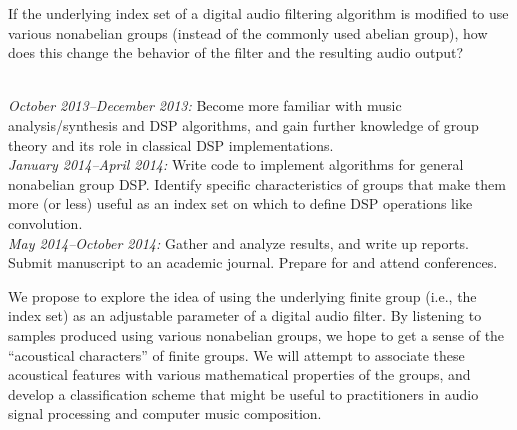 \documentclass[11pt]{article}
\begin{document}
\vskip5mm

If the underlying index set of a digital audio filtering algorithm is modified
to use various nonabelian groups (instead of the commonly used abelian group),
how does this change the behavior of the filter and the resulting audio output?

\vskip5mm

\\
{\it October 2013--December 2013:} Become more familiar with music
analysis/synthesis and \ac{DSP} algorithms, and gain further knowledge of group
theory and its role in classical \ac{DSP} implementations. 
\\[5pt]
{\it January 2014--April 2014:} Write code to implement algorithms for
general nonabelian group \ac{DSP}.  
Identify specific characteristics of groups that make them more (or less)
useful as an index set on which to define \ac{DSP} operations like convolution.
\\[5pt]
{\it May 2014--October 2014:} Gather and analyze results, and write up reports.  
Submit manuscript to an academic journal.  Prepare
for and attend conferences.

\vskip5mm


We propose to explore the idea of using the underlying finite group (i.e., the
index set) as an adjustable parameter of a digital audio filter.  By listening to
samples produced using various nonabelian groups, we hope to get a sense of the
``acoustical characters'' of finite groups.  We will attempt to associate these
acoustical features with various mathematical properties of the groups, and
develop a classification scheme that might be useful to
practitioners in audio signal processing and computer music composition.
\end{document}
